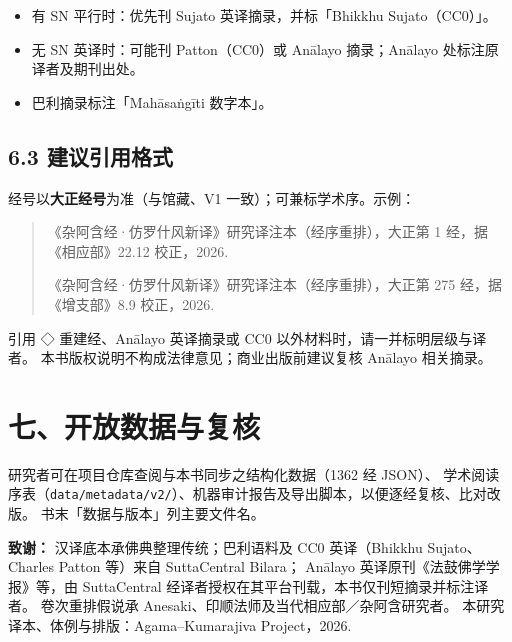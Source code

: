 \begin{itemize}
  \item 有 SN 平行时：优先刊 Sujato 英译摘录，并标「Bhikkhu Sujato（CC0）」。
  \item 无 SN 英译时：可能刊 Patton（CC0）或 Anālayo 摘录；Anālayo 处标注原译者及期刊出处。
  \item 巴利摘录标注「Mahāsaṅgīti 数字本」。
\end{itemize}

\subsection*{6.3 建议引用格式}

\noindent 经号以\textbf{大正经号}为准（与馆藏、V1 一致）；可兼标学术序。示例：

\begin{quote}\small
《杂阿含经·仿罗什风新译》研究译注本（经序重排），大正第 1 经，据《相应部》22.12 校正，2026.

《杂阿含经·仿罗什风新译》研究译注本（经序重排），大正第 275 经，据《增支部》8.9 校正，2026.
\end{quote}

\noindent 引用 ◇ 重建经、Anālayo 英译摘录或 CC0 以外材料时，请一并标明层级与译者。
本书版权说明不构成法律意见；商业出版前建议复核 Anālayo 相关摘录。

\section*{七、开放数据与复核}

研究者可在项目仓库查阅与本书同步之结构化数据（1362 经 JSON）、
学术阅读序表（\texttt{data/metadata/v2/}）、机器审计报告及导出脚本，以便逐经复核、比对改版。
书末「数据与版本」列主要文件名。

\vspace{0.8em}
\noindent\textbf{致谢：}
汉译底本承佛典整理传统；巴利语料及 CC0 英译（Bhikkhu Sujato、Charles Patton 等）来自 SuttaCentral Bilara；
Anālayo 英译原刊《法鼓佛学学报》等，由 SuttaCentral 经译者授权在其平台刊载，本书仅刊短摘录并标注译者。
卷次重排假说承 Anesaki、印顺法师及当代相应部／杂阿含研究者。
本研究译本、体例与排版：Agama–Kumarajiva Project，2026.

\clearpage

